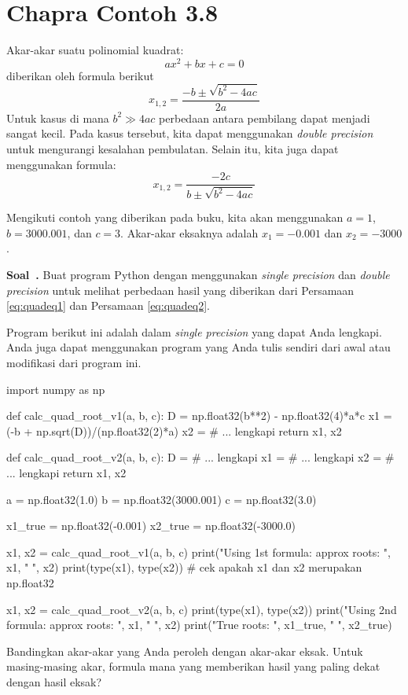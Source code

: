 \documentclass[a4paper,11pt,bahasa]{article} %
\newcounter{soal}%
\newenvironment{soal}[1][]{\refstepcounter{soal}\par\medskip
   \noindent \textbf{Soal~\thesoal. #1} \sffamily}{\medskip}
\begin{document}
\section{Chapra Contoh 3.8}
Akar-akar suatu polinomial kuadrat:
\begin{equation*}
ax^2 + bx + c = 0
\end{equation*}
diberikan oleh formula berikut
\begin{equation}
x_{1,2} = \frac{-b \pm \sqrt{b^2 - 4ac}}{2a}
\label{eq:quadeq1}
\end{equation}
Untuk kasus di mana $b^2 \gg 4ac$ perbedaan antara pembilang dapat menjadi sangat kecil.
Pada kasus tersebut, kita dapat menggunakan \textit{double precision} untuk mengurangi
kesalahan pembulatan. Selain itu, kita juga dapat menggunakan formula:
\begin{equation}
x_{1,2} = \frac{-2c}{b \pm \sqrt{b^2 - 4ac}}
\label{eq:quadeq2}
\end{equation}

Mengikuti contoh yang diberikan pada buku, kita akan menggunakan
$a = 1$, $b = 3000.001$, dan $c = 3$. Akar-akar eksaknya adalah
$x_{1} = -0.001$ dan $x_2 = -3000$.

\begin{soal}
Buat program Python dengan menggunakan \textit{single precision} dan
\textit{double precision} untuk melihat perbedaan hasil yang diberikan 
dari Persamaan \eqref{eq:quadeq1} dan Persamaan \eqref{eq:quadeq2}.

Program berikut ini adalah dalam \textit{single precision}
yang dapat Anda lengkapi. Anda juga dapat menggunakan program yang Anda tulis sendiri
dari awal atau modifikasi dari program ini.
\begin{pythoncode}
import numpy as np

def calc_quad_root_v1(a, b, c):
  D = np.float32(b**2) - np.float32(4)*a*c
  x1 = (-b + np.sqrt(D))/(np.float32(2)*a)
  x2 = # ... lengkapi
  return x1, x2
  
def calc_quad_root_v2(a, b, c):
  D = # ... lengkapi
  x1 = # ... lengkapi
  x2 = # ... lengkapi
  return x1, x2
  
a = np.float32(1.0)
b = np.float32(3000.001)
c = np.float32(3.0)
  
x1_true = np.float32(-0.001)
x2_true = np.float32(-3000.0)
  
x1, x2 = calc_quad_root_v1(a, b, c)
print("Using 1st formula: approx roots: ", x1, " ", x2)
print(type(x1), type(x2)) # cek apakah x1 dan x2 merupakan np.float32
  
x1, x2 = calc_quad_root_v2(a, b, c)
print(type(x1), type(x2))
print("Using 2nd formula: approx roots: ", x1, " ", x2)  
print("True roots: ", x1_true, " ", x2_true)
\end{pythoncode}

Bandingkan akar-akar yang Anda peroleh dengan akar-akar eksak.
Untuk masing-masing akar, formula mana yang memberikan hasil yang paling dekat dengan
hasil eksak?
\end{soal}
\end{document}
